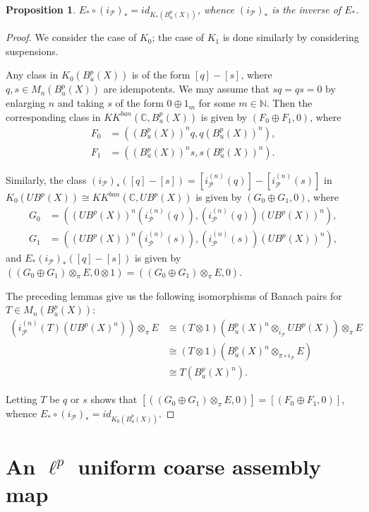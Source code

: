\documentclass[a4,11pt]{amsart}
\newtheorem{prop}[thm]{Proposition}
\theoremstyle{remark}
\begin{document}
\begin{prop}
$E_*\circ(i_\mathcal{P})_*=id_{K_*(B^p_u(X))}$, whence $(i_\mathcal{P})_*$ is the inverse of $E_*$.
\end{prop}

\begin{proof}
We consider the case of $K_0$; the case of $K_1$ is done similarly by considering suspensions.

Any class in $K_0(B^p_u(X))$ is of the form $[q]-[s]$, where $q,s\in M_n(B^p_u(X))$ are idempotents. 
We may assume that $sq=qs=0$ by enlarging $n$ and taking $s$ of the form $0\oplus 1_m$ for some $m\in\mathbb{N}$.
Then the corresponding class in $KK^{ban}(\mathbb{C},B^p_u(X))$ is given by $(F_0\oplus F_1,0)$, where 
\begin{align*}
F_0 &= ((B^p_u(X))^nq,q(B^p_u(X))^n), \\
F_1 &= ((B^p_u(X))^ns,s(B^p_u(X))^n).
\end{align*}


Similarly, the class $(i_\mathcal{P})_*([q]-[s])=[i_\mathcal{P}^{(n)}(q)]-[i_\mathcal{P}^{(n)}(s)]$ in $K_0(UB^p(X))\cong KK^{ban}(\mathbb{C},UB^p(X))$ is given by $(G_0\oplus G_1,0)$, where 
\begin{align*}
G_0 &= ((UB^p(X))^n(i_\mathcal{P}^{(n)}(q)),(i_\mathcal{P}^{(n)}(q))(UB^p(X))^n), \\
G_1 &= ((UB^p(X))^n(i_\mathcal{P}^{(n)}(s)),(i_\mathcal{P}^{(n)}(s))(UB^p(X))^n),
\end{align*}
and $E_*(i_\mathcal{P})_*([q]-[s])$ is given by $((G_0\oplus G_1)\otimes_\pi E,0\otimes 1)=((G_0\oplus G_1)\otimes_\pi E,0)$.

The preceding lemmas give us the following isomorphisms of Banach pairs for $T\in M_n(B^p_u(X))$:
\begin{align*} 
(i_\mathcal{P}^{(n)}(T)(UB^p(X)^n))\otimes_\pi E &\cong (T\otimes 1)(B^p_u(X)^n\otimes_{i_\mathcal{P}}UB^p(X))\otimes_\pi E \\
&\cong (T\otimes 1)(B^p_u(X)^n\otimes_{\pi\circ i_\mathcal{P}}E) \\
&\cong T(B^p_u(X)^n).
\end{align*}

Letting $T$ be $q$ or $s$ shows that $[((G_0\oplus G_1)\otimes_\pi E,0)]=[(F_0\oplus F_1,0)]$, whence $E_*\circ(i_\mathcal{P})_*=id_{K_0(B^p_u(X))}$.
\end{proof}


\section{An $\ell^p$ uniform coarse assembly map} \label{sect:assembly}
\end{document}
